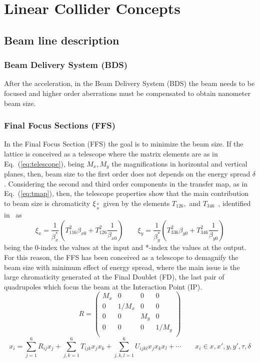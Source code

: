 \chapter{Linear Collider Concepts}
\section{Beam line description}
\subsection{Beam Delivery System (BDS)}
After the acceleration, in the Beam Delivery System (BDS) the beam needs to be focused and higher order aberrations must be compensated to obtain nanometer beam size. 
\subsection{Final Focus Sections (FFS)}
In the Final Focus Section (FFS) the goal is to minimize the beam size. If the lattice is conceived as a telescope where the matrix elements are as in Eq.~(\ref{eq:telescope}), being $M_x, M_y$ the magnifications in horizontal and vertical planes, then, beam size to the first order does not depends on the energy spread $\delta$. Considering the second and third order components in the transfer map, as in Eq.~(\ref{eq:tmap}), then, the telescope properties show that the main contribution to beam size is chromaticity $\xi_{x\atop y}$ given by the elements $T_{126},$ and $T_{346}$~\cite{Brown:1987}, identified in~\cite{GarciaMorales:1982827} as
\begin{equation}
 \xi_x = \frac{1}{\beta_x^*}\left(T_{116}^2\beta_{x0}+T_{126}^2\frac{1}{\beta_{x0}}\right)\qquad
 \xi_y = \frac{1}{\beta_y^*}\left(T_{336}^2\beta_{y0}+T_{346}^2\frac{1}{\beta_{y0}}\right)
\end{equation}
being the 0-index the values at the input and *-index the values at the output. For this reason, the FFS has been conceived as a telescope to demagnify the beam size with minimum effect of energy spread, where the main issue is the large chromaticity generated at the Final Doublet (FD), the last pair of quadrupoles which focus the beam at the Interaction Point (IP).
\begin{equation}
R=
 \begin{pmatrix}
   M_x & 0 & 0 & 0 \\
   0 & 1/M_x & 0 & 0 \\
   0 & 0 & M_y & 0 \\
   0 & 0 & 0 & 1/M_y \\
  \end{pmatrix}\label{eq:telescope}
\end{equation}
\begin{equation}
x_i=\sum_{j=1}^6R_{ij}x_j+\sum_{j,k=1}^6T_{ijk}x_jx_k+\sum_{j,k,l=1}^6U_{ijkl}x_jx_kx_l+\cdots\qquad x_i\in x,x',y,y',\tau,\delta\label{eq:tmap}
\end{equation}
